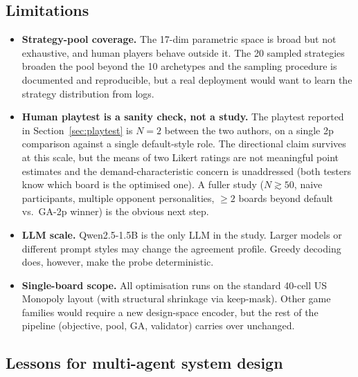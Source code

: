 \documentclass[10pt]{article}
\begin{document}
\subsection{Limitations}\label{sec:lim}

\begin{itemize}[leftmargin=1.2em,itemsep=1pt]
\item \textbf{Strategy-pool coverage.} The 17-dim parametric space is
broad but not exhaustive, and human players behave outside it. The 20
sampled strategies broaden the pool beyond the 10 archetypes and the
sampling procedure is documented and reproducible, but a real
deployment would want to learn the strategy distribution from logs.
\item \textbf{Human playtest is a sanity check, not a study.}
The playtest reported in Section~\ref{sec:playtest} is $N{=}2$
between the two authors, on a single 2p comparison against a
single default-style role. The directional claim survives at this
scale, but the means of two Likert ratings are not meaningful
point estimates and the demand-characteristic concern is
unaddressed (both testers know which board is the optimised
one). A fuller study ($N \gtrsim 50$, naive participants,
multiple opponent personalities, $\geq 2$ boards beyond default
vs.\ GA-2p winner) is the obvious next step.
\item \textbf{LLM scale.} Qwen2.5-1.5B is the only LLM in the study.
Larger models or different prompt styles may change the agreement
profile. Greedy decoding does, however, make the probe deterministic.
\item \textbf{Single-board scope.} All optimisation runs on the
standard 40-cell US Monopoly layout (with structural shrinkage via
keep-mask). Other game families would require a new design-space
encoder, but the rest of the pipeline (objective, pool, GA,
validator) carries over unchanged.
\end{itemize}

\subsection{Lessons for multi-agent system design}\label{sec:lessons}
\end{document}
